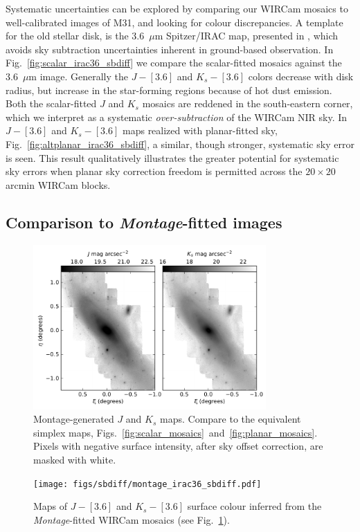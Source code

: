 \documentclass[iop]{emulateapj}
\newcommand{\sw}[1]{\textit{#1}} %
\newcommand{\Fig}[1]{Fig.~\ref{fig:#1}}  %
\begin{document}
Systematic uncertainties can be explored by comparing our WIRCam mosaics to well-calibrated images of M31, and looking for colour discrepancies.
A template for the old stellar disk, is the 3.6~$\mu$m Spitzer/IRAC map, presented in \cite{Barmby:2006}, which avoids sky subtraction uncertainties inherent in ground-based observation.
In \Fig{scalar_irac36_sbdiff} we compare the scalar-fitted mosaics against the 3.6~$\mu$m image. Generally the $J-[3.6]$ and $K_s-[3.6]$ colors decrease with disk radius, but increase in the star-forming regions because of hot dust emission. Both the scalar-fitted $J$ and $K_s$ mosaics are reddened in the south-eastern corner, which we interpret as a systematic \emph{over-subtraction} of the WIRCam NIR sky. In $J-[3.6]$ and $K_s-[3.6]$ maps realized with planar-fitted sky, \Fig{altplanar_irac36_sbdiff}, a similar, though stronger, systematic sky error is seen. This result qualitatively illustrates the greater potential for systematic sky errors when planar sky correction freedom is permitted across the $20\times 20$ arcmin WIRCam blocks.

\subsection{Comparison to \sw{Montage}-fitted images}

\begin{figure}[t]
    \centering
        \includegraphics[width=3.5in]{figs/montage_planar_mosaics.pdf}
    \caption{Montage-generated $J$ and $K_s$ maps. Compare to the equivalent simplex maps, Figs.~\ref{fig:scalar_mosaics}~and~\ref{fig:planar_mosaics}. Pixels with negative surface intensity, after sky offset correction, are masked with white.}
    \label{fig:montage_planar_mosaics}
\end{figure}

\begin{figure}[t]
    \centering
        \texttt{[image: figs/sbdiff/montage\_irac36\_sbdiff.pdf]}
    \caption{Maps of $J-[3.6]$ and $K_s-[3.6]$ surface colour inferred from the \sw{Montage}-fitted WIRCam mosaics (see \Fig{montage_planar_mosaics}).}
    \label{fig:montage_irac36_sbdiff}
\end{figure}
\end{document}
